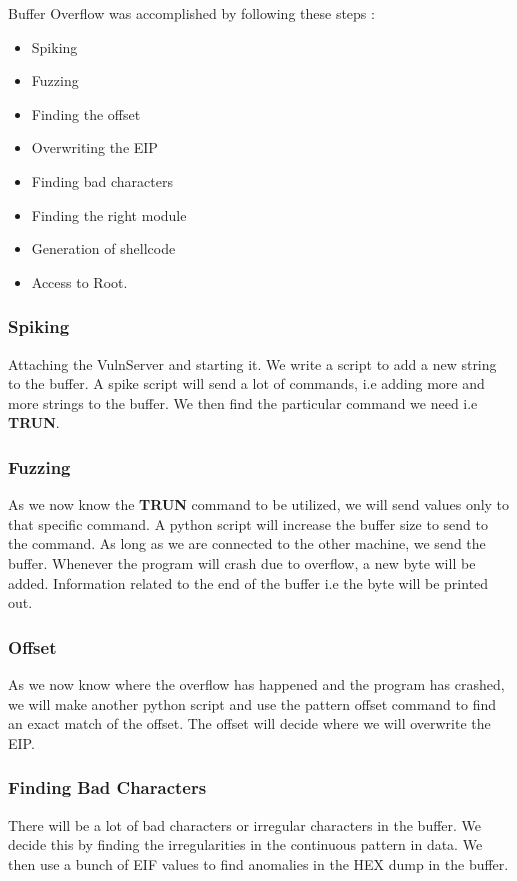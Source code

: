 \documentclass[runningheads]{llncs}
\begin{document}
Buffer Overflow was accomplished by following these steps : 

\begin{itemize}
    \item Spiking
    \item Fuzzing
    \item Finding the offset
    \item Overwriting the EIP
    \item Finding bad characters
    \item Finding the right module
    \item Generation of shellcode
    \item Access to Root.
\end{itemize}

\subsubsection{Spiking}
Attaching the VulnServer and starting it. We write a script to add a new string to the buffer. A spike script will send a lot of commands, i.e adding more and more strings to the buffer. We then find the particular command we need i.e \textbf{TRUN}. 

\subsubsection{Fuzzing}
As we now know the \textbf{TRUN} command to be utilized, we will send values only to that specific command. A python script will increase the buffer size to send to the command.
As long as we are connected to the other machine, we send the buffer. Whenever the program will crash due to overflow, a new byte will be added.
Information related to the end of the buffer i.e the byte will be printed out.

\subsubsection{Offset}
As we now know where the overflow has happened and the program has crashed, we will make another python script and use the pattern offset command to find an exact match of the offset.
The offset will decide where we will overwrite the EIP.

\subsubsection{Finding Bad Characters}
There will be a lot of bad characters or irregular characters in the buffer. We decide this by finding the irregularities in the continuous pattern in data.
We then use a bunch of EIF values to find anomalies in the HEX dump in the buffer.
\end{document}
